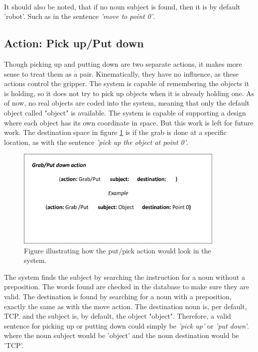 \\
It should also be noted, that if no noun subject is found, then it is by default 'robot'. Such as in the sentence \textit{'move to point 0'}.



\subsection{Action: Pick up/Put down} \label{esc:SA_Pickup}

Though picking up and putting down are two separate actions, it makes more sense to treat them as a pair. Kinematically, they have no influence, as these actions control the gripper. The system is capable of remembering the objects it is holding, so it does not try to pick up objects when it is already holding one. As of now, no real objects are coded into the system, meaning that only the default object called "object" is available. The system is capable of supporting a design where each object has its own coordinate in space. But this work is left for future work.
The destination space in figure \ref{fig:action_PUT_PICK} is if the grab is done at a specific location, as with the sentence \textit{'pick up the object at point 0'}.

\begin{figure}[ht]
    \centering
    \includegraphics[width=10cm]{img/Put_Pick_obj.png}
    \caption{Figure illustrating how the put/pick action would look in the system.}
    \label{fig:action_PUT_PICK}
\end{figure}
The system finds the subject by searching the instruction for a noun without a preposition. The words found are checked in the database to make sure they are valid.
The destination is found by searching for a noun with a preposition, exactly the same as with the move action.
The destination noun is, per default, TCP. and the subject is, by default, the object "object". Therefore, a valid sentence for picking up or putting down could simply be \textit{'pick up'} or \textit{'put down'}. where the noun subject would be 'object' and the noun destination would be 'TCP'.



